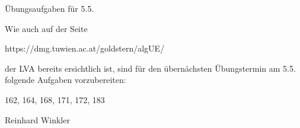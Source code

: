 Übungsaufgaben für 5.5.

Wie auch auf der Seite

https://dmg.tuwien.ac.at/goldstern/algUE/

der LVA bereits ersichtlich ist, sind für den übernächsten Übungstermin am 5.5. folgende Aufgaben vorzubereiten:

162, 164, 168, 171, 172, 183

Reinhard Winkler
